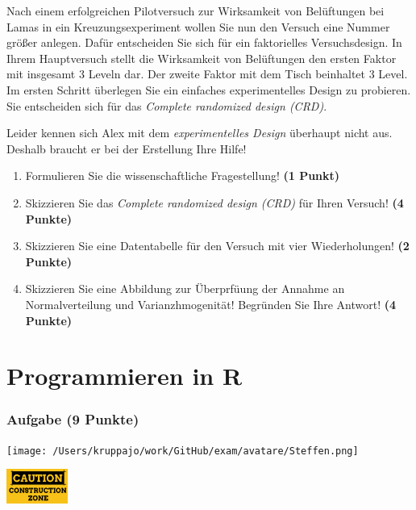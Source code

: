 \documentclass[a4paper, 9pt]{scrartcl}\usepackage[]{graphicx}\usepackage[]{xcolor}
\begin{document}
Nach einem erfolgreichen Pilotversuch zur Wirksamkeit von Belüftungen bei Lamas in ein Kreuzungsexperiment wollen Sie nun den Versuch eine Nummer größer anlegen. Dafür entscheiden Sie sich für ein faktorielles Versuchsdesign. In Ihrem Hauptversuch stellt die Wirksamkeit von Belüftungen den ersten Faktor mit insgesamt 3 Leveln dar. Der zweite Faktor mit dem Tisch beinhaltet 3 Level. \\

Im ersten Schritt überlegen Sie ein einfaches experimentelles Design zu probieren. Sie entscheiden sich für das \textit{Complete randomized design (CRD)}.

Leider kennen sich Alex mit dem \textit{experimentelles Design} überhaupt nicht aus. Deshalb braucht er bei der Erstellung Ihre Hilfe!

\begin{enumerate}
  \setcounter{enumi}{0}
  \item Formulieren Sie die wissenschaftliche Fragestellung! \textbf{(1 Punkt)}
  \item Skizzieren Sie das \textit{Complete randomized design (CRD)} für Ihren Versuch! \textbf{(4 Punkte)}
  \item Skizzieren Sie eine Datentabelle für den Versuch mit vier Wiederholungen! \textbf{(2 Punkte)}
  \item Skizzieren Sie eine Abbildung zur Überprfüung der Annahme an Normalverteilung und Varianzhmogenität! Begründen Sie Ihre Antwort! \textbf{(4 Punkte)}
\end{enumerate}


 
\clearpage
\part{Programmieren in R}

\section{Aufgabe \hfill (9 Punkte)}



 
\begin{minipage}[t]{0.5\textwidth}
\texttt{[image: /Users/kruppajo/work/GitHub/exam/avatare/Steffen.png]}
\end{minipage}
\begin{minipage}[t]{0.5\textwidth}
\hfill
\href{https://youtu.be/C9skfFRTHhI}{\includegraphics[width = 2cm]{img/caution}}
\end{minipage}
\vspace{1ex}
\end{document}
